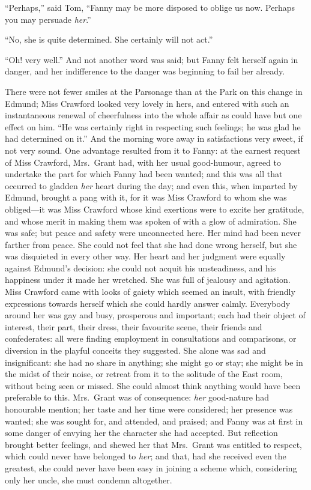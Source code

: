 \documentclass{article}
\begin{document}
``Perhaps,'' said Tom, ``Fanny may be more disposed to oblige
us now.  Perhaps you may persuade \emph{her}.''

``No, she is quite determined.  She certainly will not act.''

``Oh! very well.''  And not another word was said; but Fanny
felt herself again in danger, and her indifference
to the danger was beginning to fail her already.

There were not fewer smiles at the Parsonage than at the Park
on this change in Edmund; Miss Crawford looked very lovely
in hers, and entered with such an instantaneous renewal
of cheerfulness into the whole affair as could have but
one effect on him.  ``He was certainly right in respecting
such feelings; he was glad he had determined on it.''
And the morning wore away in satisfactions very sweet,
if not very sound.  One advantage resulted from it
to Fanny:  at the earnest request of Miss Crawford,
Mrs.\ Grant had, with her usual good-humour, agreed
to undertake the part for which Fanny had been wanted;
and this was all that occurred to gladden \emph{her} heart
during the day; and even this, when imparted by Edmund,
brought a pang with it, for it was Miss Crawford to
whom she was obliged---it was Miss Crawford whose kind
exertions were to excite her gratitude, and whose merit
in making them was spoken of with a glow of admiration.
She was safe; but peace and safety were unconnected here.
Her mind had been never farther from peace.  She could
not feel that she had done wrong herself, but she was
disquieted in every other way.  Her heart and her judgment
were equally against Edmund's decision:  she could not
acquit his unsteadiness, and his happiness under it made
her wretched.  She was full of jealousy and agitation.
Miss Crawford came with looks of gaiety which seemed
an insult, with friendly expressions towards herself
which she could hardly answer calmly.  Everybody around
her was gay and busy, prosperous and important; each had
their object of interest, their part, their dress,
their favourite scene, their friends and confederates:
all were finding employment in consultations and comparisons,
or diversion in the playful conceits they suggested.
She alone was sad and insignificant:  she had no share
in anything; she might go or stay; she might be in the
midst of their noise, or retreat from it to the solitude
of the East room, without being seen or missed.  She could
almost think anything would have been preferable to this.
Mrs.\ Grant was of consequence:  \emph{her} good-nature had
honourable mention; her taste and her time were considered;
her presence was wanted; she was sought for, and attended,
and praised; and Fanny was at first in some danger
of envying her the character she had accepted.
But reflection brought better feelings, and shewed her
that Mrs.\ Grant was entitled to respect, which could never
have belonged to \emph{her}; and that, had she received even
the greatest, she could never have been easy in joining
a scheme which, considering only her uncle, she must
condemn altogether.
\end{document}
